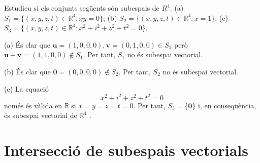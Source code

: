 \bigskip

\begin{exercici}
Estudieu si els conjunts següents són subespais de $R^{4}$. (a) $%
S_{1}=\{(x,y,z,t)\in \mathbb{R}^{4}:xy=0\}$; (b) $S_{2}=\{(x,y,z,t)\in
\mathbb{R}^{4}:x=1\}$; (c) $S_{3}=\{(x,y,z,t)\in \mathbb{R}%
^{4}:x^{2}+i^{2}+z^{2}+t^{2}=0\}$.

\end{exercici}
\begin{solucio}
(a) És clar que $\mathbf{u}=(1,0,0,0),\mathbf{v}=(0,1,0,0)\in S_{1}$ però $%
\mathbf{u}+\mathbf{v}=(1,1,0,0)\notin S_{1}$. Per tant, $S_{1}$ no és
subespai vectorial.

(b) És clar que $\mathbf{0}=(0,0,0,0)\notin S_{2}$. Per tant, $S_{2}$ no
és subespai vectorial.

(c) La equació%
\begin{equation*}
x^{2}+i^{2}+z^{2}+t^{2}=0
\end{equation*}%
només és vàlida en $\mathbb{R}$ si $x=y=z=t=0$. Per tant, $S_{3}=\{%
\mathbf{0}\}$ i, en conseqüència, és subespai vectorial de $\mathbb{R}^{4}$%
.
\end{solucio}

\section{Intersecció de subespais vectorials}


